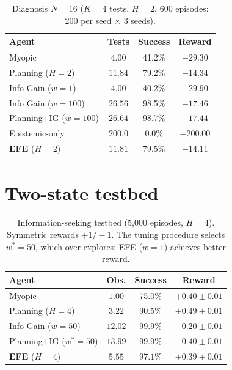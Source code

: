 \documentclass{article}
\begin{document}
\begin{table}[h]
\centering
\caption{Diagnosis $N{=}16$ ($K{=}4$ tests, $H{=}2$, 600 episodes: 200 per seed $\times$ 3 seeds).}
\begin{small}
\begin{tabular}{lccc}
\toprule
Agent & Tests & Success & Reward \\
\midrule
Myopic & $4.00$ & 41.2\% & $-29.30$ \\
Planning ($H{=}2$) & $11.84$ & 79.2\% & $-14.34$ \\
Info Gain ($w{=}1$) & $4.00$ & 40.2\% & $-29.90$ \\
Info Gain ($w{=}100$) & $26.56$ & 98.5\% & $-17.46$ \\
Planning+IG ($w{=}100$) & $26.64$ & 98.7\% & $-17.44$ \\
Epistemic-only & $200.0$ & 0.0\% & $-200.00$ \\
\textbf{EFE} ($H{=}2$) & $\mathbf{11.81}$ & $\mathbf{79.5\%}$ & $\mathbf{-14.11}$ \\
\bottomrule
\end{tabular}
\end{small}
\end{table}

\section{Two-state testbed}
\label{app:testbed}

\begin{table}[h]
\centering
\caption{Information-seeking testbed (5{,}000 episodes, $H{=}4$). Symmetric rewards $+1 / {-}1$. The tuning procedure selects $w^*{=}50$, which over-explores; EFE ($w{=}1$) achieves better reward.}
\begin{small}
\begin{tabular}{lccc}
\toprule
Agent & Obs. & Success & Reward \\
\midrule
Myopic & $1.00$ & 75.0\% & $+0.40 \pm 0.01$ \\
Planning ($H{=}4$) & $3.22$ & 90.5\% & $\mathbf{+0.49 \pm 0.01}$ \\
Info Gain ($w{=}50$) & $12.02$ & 99.9\% & $-0.20 \pm 0.01$ \\
Planning+IG ($w^*{=}50$) & $13.99$ & 99.9\% & $-0.40 \pm 0.01$ \\
\textbf{EFE} ($H{=}4$) & $5.55$ & $\mathbf{97.1\%}$ & $+0.39 \pm 0.01$ \\
\bottomrule
\end{tabular}
\end{small}
\end{table}
\end{document}
